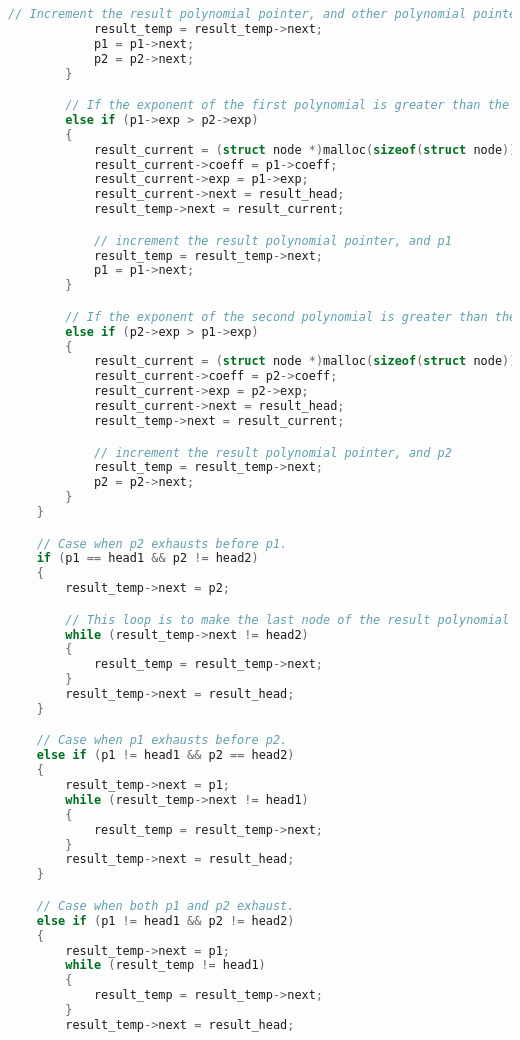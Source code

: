 \documentclass{article}
\begin{document}
\begin{lstlisting}[language = c++, caption = Input Code]
            // Increment the result polynomial pointer, and other polynomial pointers.
            result_temp = result_temp->next;
            p1 = p1->next;
            p2 = p2->next;
        }

        // If the exponent of the first polynomial is greater than the second one, add the node to the result polynomial.
        else if (p1->exp > p2->exp)
        {
            result_current = (struct node *)malloc(sizeof(struct node));
            result_current->coeff = p1->coeff;
            result_current->exp = p1->exp;
            result_current->next = result_head;
            result_temp->next = result_current;

            // increment the result polynomial pointer, and p1
            result_temp = result_temp->next;
            p1 = p1->next;
        }

        // If the exponent of the second polynomial is greater than the first one, add the node to the result polynomial.
        else if (p2->exp > p1->exp)
        {
            result_current = (struct node *)malloc(sizeof(struct node));
            result_current->coeff = p2->coeff;
            result_current->exp = p2->exp;
            result_current->next = result_head;
            result_temp->next = result_current;

            // increment the result polynomial pointer, and p2
            result_temp = result_temp->next;
            p2 = p2->next;
        }
    }

    // Case when p2 exhausts before p1.
    if (p1 == head1 && p2 != head2)
    {
        result_temp->next = p2;

        // This loop is to make the last node of the result polynomial point to the head of the result polynomial.
        while (result_temp->next != head2)
        {
            result_temp = result_temp->next;
        }
        result_temp->next = result_head;
    }

    // Case when p1 exhausts before p2.
    else if (p1 != head1 && p2 == head2)
    {
        result_temp->next = p1;
        while (result_temp->next != head1)
        {
            result_temp = result_temp->next;
        }
        result_temp->next = result_head;
    }

    // Case when both p1 and p2 exhaust.
    else if (p1 != head1 && p2 != head2)
    {
        result_temp->next = p1;
        while (result_temp != head1)
        {
            result_temp = result_temp->next;
        }
        result_temp->next = result_head;


\end{lstlisting}
\end{document}
